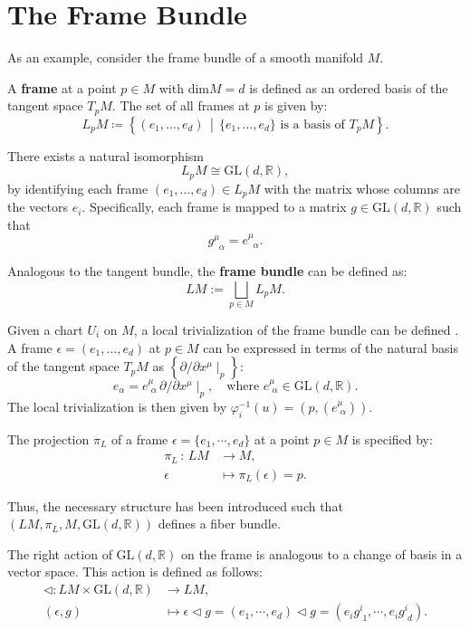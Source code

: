\section{The Frame Bundle}

As an example, consider the frame bundle of a smooth manifold \( M \)\cite{NakaharaGeometrytopologyphysics2005}.

A \textbf{frame} at a point \( p \in M \) with \(\text{dim} M = d\) is defined as an ordered basis of the tangent space \(T_pM\). The set of all frames at \( p \) is given by:
\[
L_pM \coloneqq \left\{ (e_1, \dots, e_d) \,\middle|\, \{e_1, \dots, e_d\} \text{ is a basis of } T_pM \right\}.
\]

There exists a natural isomorphism
\[
L_pM \cong \mathrm{GL}(d, \mathbb{R}),
\]
by identifying each frame \( (e_1, \dots, e_d) \in L_pM \) with the matrix whose columns are the vectors \( e_i \). Specifically, each frame is mapped to a matrix \( g \in \mathrm{GL}(d, \mathbb{R}) \) such that
\[
g^\mu_{\;\;\alpha} = e^\mu_{\;\;\alpha}.
\]

Analogous to the tangent bundle, the \textbf{frame bundle} can be defined as:
\[ LM := \bigsqcup_{p \in M} L_pM. \]

Given a chart \( U_i \) on \( M \), a local trivialization of the frame bundle can be defined \cite{NakaharaGeometrytopologyphysics2005}. A frame \( \epsilon = (e_1, \dots, e_d) \) at \( p \in M \) can be expressed in terms of the natural basis of the tangent space \( T_pM \) as \( \left\{ \partial / \partial x^\mu \mid_p \right\} \):
\[ e_\alpha = e^\mu_{\,\,\alpha} \, \partial/\partial x^\mu \mid_p, \quad \text{where } e^\mu_{\,\,\alpha} \in \mathrm{GL}(d, \mathbb{R}). \]
The local trivialization is then given by \( \varphi_i^{-1}(u)=(p,(e^\mu_{\,\,\alpha})) \).

The projection \( \pi_L \) of a frame \( \epsilon = \{e_1, \cdots, e_d\} \) at a point \( p \in M \) is specified by:
\begin{align*}
  \pi_L \, : \, LM & \longrightarrow M, \\
        \epsilon & \mapsto \pi_L(\epsilon)=p.
\end{align*}

Thus, the necessary structure has been introduced such that \( (LM, \pi_L, M, \text{GL}(d,\mathbb{R})) \) defines a fiber bundle.

The right action of \( \mathrm{GL}(d,\mathbb{R}) \) on the frame is analogous to a change of basis in a vector space. This action is defined as follows:
\begin{align*}
  \triangleleft : LM \times \mathrm{GL}(d,\mathbb{R}) & \longrightarrow LM, \\
  (\epsilon, g) & \mapsto \epsilon \triangleleft g = (e_1, \cdots, e_d) \triangleleft g = (e_i g^i_{\,\,1}, \cdots, e_i g^i_{\,\,d}).
\end{align*}

